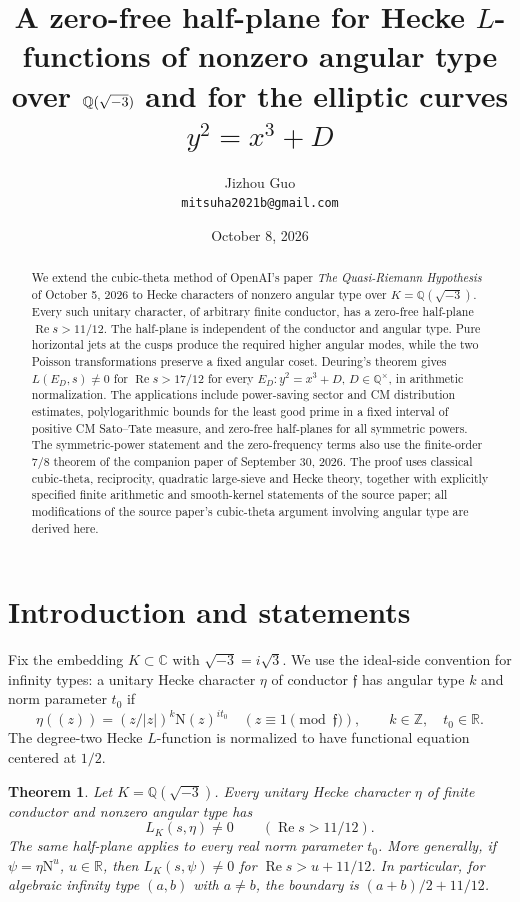 \documentclass[11pt,a4paper]{article}
\title{A zero-free half-plane for Hecke $L$-functions of nonzero angular type over $\Q(\sqrt{-3})$ and for the elliptic curves $y^2=x^3+D$}
\author{Jizhou Guo\\\texttt{mitsuha2021b@gmail.com}}
\date{October 8, 2026}
\numberwithin{equation}{section}
\newtheorem{maintheorem}{Theorem}
\theoremstyle{definition}
\theoremstyle{remark}
\newcommand{\Q}{\mathbb Q}
\newcommand{\C}{\mathbb C}
\newcommand{\R}{\mathbb R}
\newcommand{\Z}{\mathbb Z}
\newcommand{\N}{\mathrm N}
\newcommand{\Rea}{\operatorname{Re}}
\begin{document}
\maketitle
\begin{abstract}
We extend the cubic-theta method of OpenAI's paper \emph{The Quasi-Riemann Hypothesis} of October 5, 2026 to Hecke characters of nonzero angular type over $K=\Q(\sqrt{-3})$. Every such unitary character, of arbitrary finite conductor, has a zero-free half-plane $\Rea s>11/12$. The half-plane is independent of the conductor and angular type. Pure horizontal jets at the cusps produce the required higher angular modes, while the two Poisson transformations preserve a fixed angular coset. Deuring's theorem gives $L(E_D,s)\ne0$ for $\Rea s>17/12$ for every $E_D:y^2=x^3+D$, $D\in\Q^\times$, in arithmetic normalization. The applications include power-saving sector and CM distribution estimates, polylogarithmic bounds for the least good prime in a fixed interval of positive CM Sato--Tate measure, and zero-free half-planes for all symmetric powers. The symmetric-power statement and the zero-frequency terms also use the finite-order $7/8$ theorem of the companion paper of September 30, 2026. The proof uses classical cubic-theta, reciprocity, quadratic large-sieve and Hecke theory, together with explicitly specified finite arithmetic and smooth-kernel statements of the source paper; all modifications of the source paper's cubic-theta argument involving angular type are derived here.
\end{abstract}
\tableofcontents

\section{Introduction and statements}
Fix the embedding $K\subset\C$ with $\sqrt{-3}=i\sqrt3$. We use the ideal-side convention for infinity types: a unitary Hecke character $\eta$ of conductor $\mathfrak f$ has angular type $k$ and norm parameter $t_0$ if
\[
 \eta((z))=(z/|z|)^k\N(z)^{it_0}\quad(z\equiv1\pmod{\mathfrak f}),\qquad k\in\Z,\quad t_0\in\R.
\]
The degree-two Hecke $L$-function is normalized to have functional equation centered at $1/2$.

\begin{maintheorem}\label{thm:A}
Let $K=\Q(\sqrt{-3})$. Every unitary Hecke character $\eta$ of finite conductor and nonzero angular type has
\[
 L_K(s,\eta)\ne0\qquad(\Rea s>11/12).
\]
The same half-plane applies to every real norm parameter $t_0$. More generally, if $\psi=\eta\N^u$, $u\in\R$, then $L_K(s,\psi)\ne0$ for $\Rea s>u+11/12$. In particular, for algebraic infinity type $(a,b)$ with $a\ne b$, the boundary is $(a+b)/2+11/12$.
\end{maintheorem}
\end{document}
